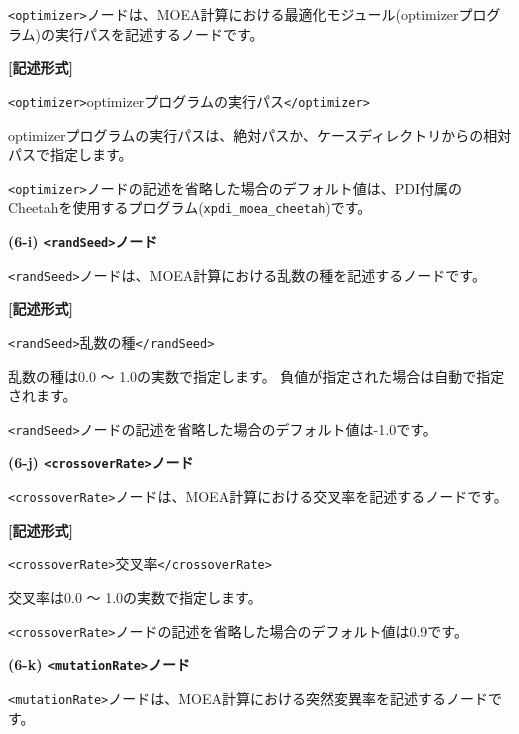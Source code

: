 \documentclass[a4paper,11pt]{jarticle}
\begin{document}
{\texttt{<optimizer>}ノードは、MOEA計算における最適化モジュール(optimizerプログラム)の実行パスを記述するノードです。

\vspace{8pt}
\leftskip=12pt
\textbf{[記述形式]}

\leftskip=42pt
\texttt{<optimizer>}optimizerプログラムの実行パス\texttt{</optimizer>}

\vspace{8pt}
\leftskip=0pt
optimizerプログラムの実行パスは、絶対パスか、ケースディレクトリからの相対パスで指定します。

\texttt{<optimizer>}ノードの記述を省略した場合のデフォルト値は、PDI付属のCheetahを使用するプログラム({\tt xpdi\_moea\_cheetah})です。

\vspace{12pt}
\textbf{(6-i) \texttt{<randSeed>}ノード}

\texttt{<randSeed>}ノードは、MOEA計算における乱数の種を記述するノードです。

\vspace{8pt}
\leftskip=12pt
\textbf{[記述形式]}

\leftskip=42pt
\texttt{<randSeed>}乱数の種\texttt{</randSeed>}

\vspace{8pt}
\leftskip=0pt
乱数の種は0.0 〜 1.0の実数で指定します。
負値が指定された場合は自動で指定されます。

\texttt{<randSeed>}ノードの記述を省略した場合のデフォルト値は-1.0です。

\vspace{12pt}
\textbf{(6-j) \texttt{<crossoverRate>}ノード}

\texttt{<crossoverRate>}ノードは、MOEA計算における交叉率を記述するノードです。

\vspace{8pt}
\leftskip=12pt
\textbf{[記述形式]}

\leftskip=42pt
\texttt{<crossoverRate>}交叉率\texttt{</crossoverRate>}

\vspace{8pt}
\leftskip=0pt
交叉率は0.0 〜 1.0の実数で指定します。

\texttt{<crossoverRate>}ノードの記述を省略した場合のデフォルト値は0.9です。

\vspace{12pt}
\textbf{(6-k) \texttt{<mutationRate>}ノード}

\texttt{<mutationRate>}ノードは、MOEA計算における突然変異率を記述するノードです。

}
\end{document}
